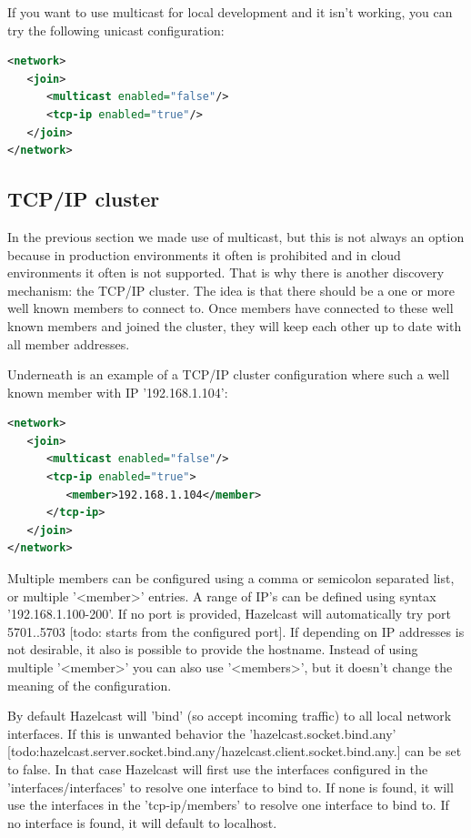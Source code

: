 If you want to use multicast for local development and it isn't working, you can try the following unicast configuration:
\begin{lstlisting}[language=xml]
<network>
   <join>
      <multicast enabled="false"/>
      <tcp-ip enabled="true"/>
   </join>
</network>
\end{lstlisting}

\subsection{TCP/IP cluster}
In the previous section we made use of multicast, but this is not always an option because in production environments it often is prohibited and in cloud environments it often is not supported. That is why there is another discovery mechanism: the TCP/IP cluster. The idea is that there should be a one or more well known members to connect to. Once members have connected to these well known members and joined the cluster, they will keep each other up to date with all member addresses.

Underneath is an example of a TCP/IP cluster configuration where such a well known member with IP '192.168.1.104':
\begin{lstlisting}[language=xml]
<network>
   <join>
      <multicast enabled="false"/>
      <tcp-ip enabled="true">
         <member>192.168.1.104</member> 
      </tcp-ip>
   </join>
</network>
\end{lstlisting}
Multiple members can be configured using a comma or semicolon separated list, or multiple '<member>' entries. A range of IP's can be defined using syntax '192.168.1.100-200'. If no port is provided, Hazelcast will automatically try port 5701..5703 [todo: starts from the configured port]. If depending on IP addresses is not desirable, it also is possible to provide the hostname. Instead of using multiple '<member>' you can also use '<members>', but it doesn't change the meaning of the configuration. 

By default Hazelcast will 'bind' (so accept incoming traffic) to all local network interfaces. If this is unwanted behavior the 'hazelcast.socket.bind.any' [todo:hazelcast.server.socket.bind.any/hazelcast.client.socket.bind.any.] can be set to false. In that case Hazelcast will first use the interfaces configured in the 'interfaces/interfaces' to resolve one interface to bind to. If none is found, it will use the interfaces in the 'tcp-ip/members' to resolve one interface to bind to. If no interface is found, it will default to localhost.

